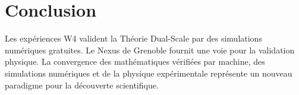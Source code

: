 \documentclass[11pt, twocolumn]{article}
\begin{document}
\section{Conclusion}
Les expériences W4 valident la Théorie Dual-Scale par des simulations numériques gratuites. Le Nexus de Grenoble fournit une voie pour la validation physique. La convergence des mathématiques vérifiées par machine, des simulations numériques et de la physique expérimentale représente un nouveau paradigme pour la découverte scientifique.



\end{document}
